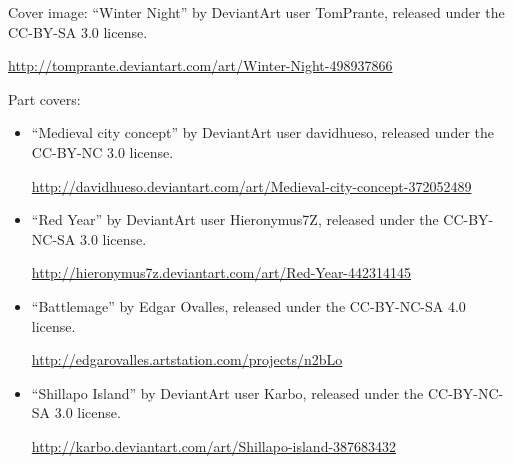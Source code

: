 \item Cover image: ``Winter Night'' by DeviantArt user TomPrante,
  released under the CC-BY-SA 3.0 license.

  \url{http://tomprante.deviantart.com/art/Winter-Night-498937866}

\item Part covers: \begin{itemize}

\item ``Medieval city concept'' by DeviantArt user davidhueso, released under the CC-BY-NC 3.0 license.

  \url{http://davidhueso.deviantart.com/art/Medieval-city-concept-372052489}

\item ``Red Year'' by DeviantArt user Hieronymus7Z, released under the CC-BY-NC-SA 3.0 license.

  \url{http://hieronymus7z.deviantart.com/art/Red-Year-442314145}

\item ``Battlemage'' by Edgar Ovalles, released under the CC-BY-NC-SA 4.0 license.

  \url{http://edgarovalles.artstation.com/projects/n2bLo}

\item ``Shillapo Island'' by DeviantArt user Karbo, released under the CC-BY-NC-SA 3.0 license.

  \url{http://karbo.deviantart.com/art/Shillapo-island-387683432}

\end{itemize}
